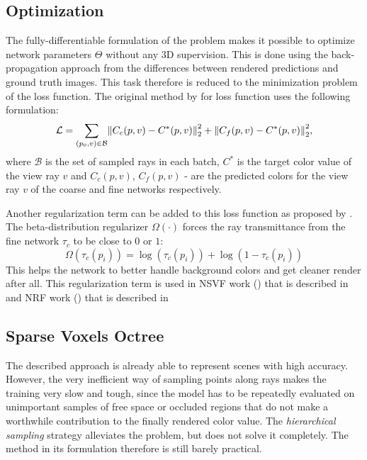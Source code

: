 \subsection{Optimization}

The fully-differentiable formulation of the problem makes it possible
to optimize network parameters $\Theta$ without any 3D supervision.
This is done using the back-propagation approach from the differences
between rendered predictions and ground truth images.
This task therefore is reduced to the minimization problem of the loss function.
The original method by \cite{mildenhall2020nerf} for loss function uses the following formulation:
\begin{equation}
    \mathcal{L} = \sum_{(p_0, v) \in \mathcal{B}} \norm{ C_c(p, v) - C^*(p, v) }^2_2 + \norm{ C_f(p, v) - C^*(p, v) }^2_2,
\end{equation}
where $\mathcal{B}$ is the set of sampled rays in each batch,
$C^*$ is the target color value of the view ray $v$ and
$C_c(p, v)$, $C_f(p, v)$ - are the predicted colors for the view ray $v$ of the coarse and fine networks respectively.

Another regularization term can be added to this loss function as proposed by \cite{Lombardi_2019}.
The beta-distribution regularizer $\Omega(\cdot)$
forces the ray transmittance from the fine network $\tau_c$ to be close to $0$ or $1$:
\begin{equation}
    \Omega(\tau_c(p_i)) = \log(\tau_c(p_i)) + \log(1 - \tau_c(p_i))
\end{equation}
This helps the network to better handle background colors and get cleaner render after all.
This regularization term is used in NSVF work (\cite{liu2021neural})
that is described in 
and NRF work (\cite{bi2020neural}) that is described in 



\subsection{Sparse Voxels Octree}
\label{subsec:NSVF}
The described approach is already able to represent scenes with high accuracy.
However, the very inefficient way of sampling points along rays
makes the training very slow and tough,
since the model has to be repeatedly evaluated on unimportant samples
of free space or occluded regions that do not make a worthwhile contribution to the finally rendered color value.
The \textit{hierarchical sampling} strategy alleviates the problem,
but does not solve it completely.
The method in its formulation therefore is still barely practical.


